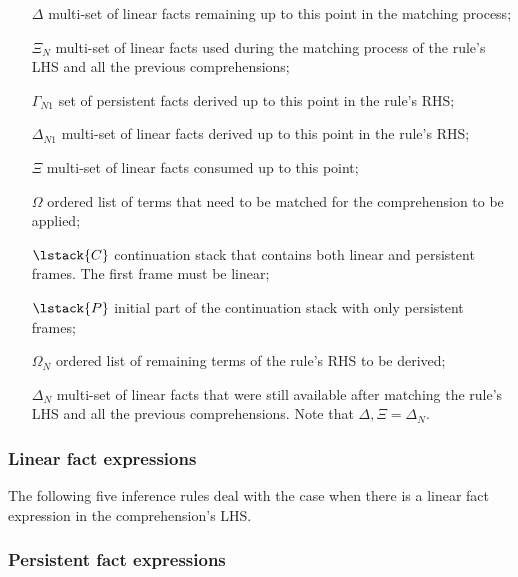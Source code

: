 \begin{enumerate}

   \item[$\Delta$] multi-set of linear facts remaining up to this point in the
   matching process;

   \item[$\Xi_N$] multi-set of linear facts used during the matching process of
   the rule's LHS and all the previous comprehensions;


   \item[$\Gamma_{N1}$] set of persistent facts derived up to this point in the
      rule's RHS;

   \item[$\Delta_{N1}$] multi-set of linear facts derived up to this point in
   the rule's RHS;

   \item[$\Xi$] multi-set of linear facts consumed up to this point;

   \item[$\Omega$] ordered list of terms that need to be matched for the
   comprehension to be applied;

   \item[$\lstack{C}$] continuation stack that contains both linear and
   persistent frames. The first frame must be linear;

   \item[$\lstack{P}$] initial part of the continuation stack with only persistent
   frames;


   \item[$\Omega_N$] ordered list of remaining terms of the rule's RHS to be
      derived;

   \item[$\Delta_N$] multi-set of linear facts that were still available after
   matching the rule's LHS and all the previous comprehensions. Note that
   $\Delta, \Xi = \Delta_N$.

\end{enumerate}

\subsubsection{Linear fact expressions}

The following five inference rules deal with the case when there is a linear
fact expression in the comprehension's LHS.



\subsubsection{Persistent fact expressions}

